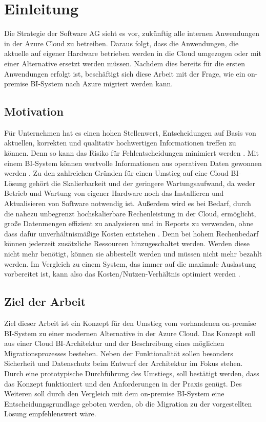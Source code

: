 \chapter{Einleitung} \label{ch:intro}
Die Strategie der Software AG sieht es vor, zukünftig alle internen Anwendungen in der Azure Cloud zu betreiben. Daraus folgt, dass die Anwendungen, die aktuelle auf eigener Hardware betrieben werden in die Cloud umgezogen oder mit einer Alternative ersetzt werden müssen. Nachdem dies bereits für die ersten Anwendungen erfolgt ist, beschäftigt sich diese Arbeit mit der Frage, wie ein on-premise BI-System nach Azure migriert werden kann.

\section{Motivation} \label{sec:intro:motivation}
Für Unternehmen hat es einen hohen Stellenwert, Entscheidungen auf Basis von aktuellen, korrekten und qualitativ hochwertigen Informationen treffen zu können. Denn so kann das Risiko für Fehlentscheidungen minimiert werden \cite{grunwald_business_2009}. Mit einem BI-System können wertvolle Informationen aus operativen Daten gewonnen werden \cite{muller_business_2013}. Zu den zahlreichen Gründen für einen Umstieg auf eine Cloud BI-Lösung gehört die Skalierbarkeit und der geringere Wartungsaufwand, da weder Betrieb und Wartung von eigener Hardware noch das Installieren und Aktualisieren von Software notwendig ist. Außerdem wird es bei Bedarf, durch die nahezu unbegrenzt hochskalierbare Rechenleistung in der Cloud, ermöglicht, große Datenmengen effizient zu analysieren und in Reports zu verwenden, ohne dass dafür unverhältnismäßige Kosten entstehen \cite{gurjar_cloud_2013}. Denn bei hohem Rechenbedarf können jederzeit zusätzliche Ressourcen hinzugeschaltet werden. Werden diese nicht mehr benötigt, können sie abbestellt werden und müssen nicht mehr bezahlt werden. Im Vergleich zu einem System, das immer auf die maximale Auslastung vorbereitet ist, kann also das Kosten/Nutzen-Verhältnis optimiert werden \cite{ouf_cloud_2011}.

\section{Ziel der Arbeit} \label{sec:intro:ziele}
Ziel dieser Arbeit ist ein Konzept für den Umstieg vom vorhandenen on-premise BI-System zu einer modernen Alternative in der Azure Cloud. Das Konzept soll aus einer Cloud BI-Architektur und der Beschreibung eines möglichen Migrationsprozesses bestehen. Neben der Funktionalität sollen besonders Sicherheit und Datenschutz beim Entwurf der Architektur im Fokus stehen. Durch eine prototypische Durchführung des Umstiegs, soll bestätigt werden, dass das Konzept funktioniert und den Anforderungen in der Praxis genügt. Des Weiteren soll durch den Vergleich mit dem on-premise BI-System eine Entscheidungsgrundlage geboten werden, ob die Migration zu der vorgestellten Lösung empfehlenswert wäre.

